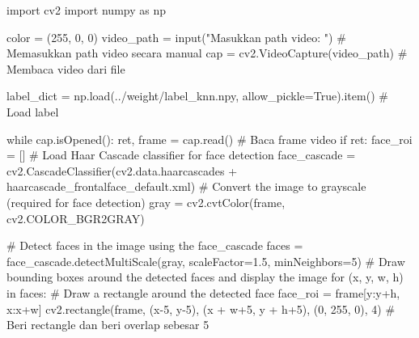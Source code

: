 \documentclass[
  letterpaper,
  DIV=11,
  numbers=noendperiod]{scrreprt}
\newenvironment{Shaded}{\begin{snugshade}}{\end{snugshade}}
\newcommand{\BuiltInTok}[1]{\textcolor[rgb]{0.00,0.23,0.31}{#1}}
\newcommand{\CommentTok}[1]{\textcolor[rgb]{0.37,0.37,0.37}{#1}}
\newcommand{\ControlFlowTok}[1]{\textcolor[rgb]{0.00,0.23,0.31}{#1}}
\newcommand{\DecValTok}[1]{\textcolor[rgb]{0.68,0.00,0.00}{#1}}
\newcommand{\FloatTok}[1]{\textcolor[rgb]{0.68,0.00,0.00}{#1}}
\newcommand{\ImportTok}[1]{\textcolor[rgb]{0.00,0.46,0.62}{#1}}
\newcommand{\KeywordTok}[1]{\textcolor[rgb]{0.00,0.23,0.31}{#1}}
\newcommand{\NormalTok}[1]{\textcolor[rgb]{0.00,0.23,0.31}{#1}}
\newcommand{\OperatorTok}[1]{\textcolor[rgb]{0.37,0.37,0.37}{#1}}
\newcommand{\StringTok}[1]{\textcolor[rgb]{0.13,0.47,0.30}{#1}}
\newcommand{\VariableTok}[1]{\textcolor[rgb]{0.07,0.07,0.07}{#1}}
\begin{document}
\begin{Shaded}
\begin{Highlighting}[]
\ImportTok{import}\NormalTok{ cv2}
\ImportTok{import}\NormalTok{ numpy }\ImportTok{as}\NormalTok{ np}

\NormalTok{color }\OperatorTok{=}\NormalTok{ (}\DecValTok{255}\NormalTok{, }\DecValTok{0}\NormalTok{, }\DecValTok{0}\NormalTok{)}
\NormalTok{video\_path }\OperatorTok{=} \BuiltInTok{input}\NormalTok{(}\StringTok{"Masukkan path video: "}\NormalTok{)  }\CommentTok{\# Memasukkan path video secara manual}
\NormalTok{cap }\OperatorTok{=}\NormalTok{ cv2.VideoCapture(video\_path)  }\CommentTok{\# Membaca video dari file}

\NormalTok{label\_dict }\OperatorTok{=}\NormalTok{ np.load(}\StringTok{\textquotesingle{}../weight/label\_knn.npy\textquotesingle{}}\NormalTok{, allow\_pickle}\OperatorTok{=}\VariableTok{True}\NormalTok{).item()  }\CommentTok{\# Load label}

\ControlFlowTok{while}\NormalTok{ cap.isOpened():}
\NormalTok{    ret, frame }\OperatorTok{=}\NormalTok{ cap.read()  }\CommentTok{\# Baca frame video}
    \ControlFlowTok{if}\NormalTok{ ret:}
\NormalTok{        face\_roi }\OperatorTok{=}\NormalTok{ []  }\CommentTok{\# Load Haar Cascade classifier for face detection}
\NormalTok{        face\_cascade }\OperatorTok{=}\NormalTok{ cv2.CascadeClassifier(cv2.data.haarcascades }\OperatorTok{+} \StringTok{\textquotesingle{}haarcascade\_frontalface\_default.xml\textquotesingle{}}\NormalTok{)}
        \CommentTok{\# Convert the image to grayscale (required for face detection)}
\NormalTok{        gray }\OperatorTok{=}\NormalTok{ cv2.cvtColor(frame, cv2.COLOR\_BGR2GRAY)}

        \CommentTok{\# Detect faces in the image using the face\_cascade}
\NormalTok{        faces }\OperatorTok{=}\NormalTok{ face\_cascade.detectMultiScale(gray, scaleFactor}\OperatorTok{=}\FloatTok{1.5}\NormalTok{, minNeighbors}\OperatorTok{=}\DecValTok{5}\NormalTok{)}
        \CommentTok{\# Draw bounding boxes around the detected faces and display the image}
        \ControlFlowTok{for}\NormalTok{ (x, y, w, h) }\KeywordTok{in}\NormalTok{ faces:}
            \CommentTok{\# Draw a rectangle around the detected face}
\NormalTok{            face\_roi }\OperatorTok{=}\NormalTok{ frame[y:y}\OperatorTok{+}\NormalTok{h, x:x}\OperatorTok{+}\NormalTok{w]}
\NormalTok{            cv2.rectangle(frame, (x}\OperatorTok{{-}}\DecValTok{5}\NormalTok{, y}\OperatorTok{{-}}\DecValTok{5}\NormalTok{), (x }\OperatorTok{+}\NormalTok{ w}\OperatorTok{+}\DecValTok{5}\NormalTok{, y }\OperatorTok{+}\NormalTok{ h}\OperatorTok{+}\DecValTok{5}\NormalTok{), (}\DecValTok{0}\NormalTok{, }\DecValTok{255}\NormalTok{, }\DecValTok{0}\NormalTok{), }\DecValTok{4}\NormalTok{)  }\CommentTok{\# Beri rectangle dan beri overlap sebesar 5}


\end{Highlighting}
\end{Shaded}
\end{document}
